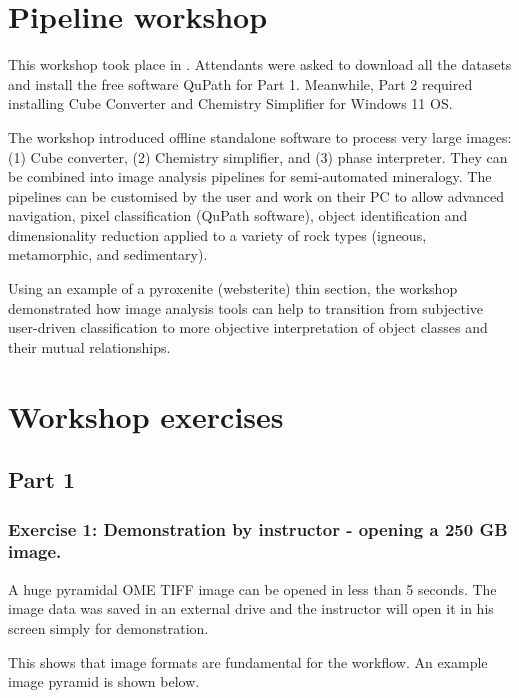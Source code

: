 \section{Pipeline workshop}
\label{chap:workshop1}
	
	This workshop took place in . Attendants were asked to download all the datasets and install the free software QuPath for Part 1. Meanwhile, Part 2 required installing Cube Converter and Chemistry Simplifier for Windows 11 OS.
	
	The workshop introduced offline standalone software to process very large images: (1) Cube converter, (2) Chemistry simplifier, and (3) phase interpreter. They can be combined into image analysis pipelines for semi-automated mineralogy. The pipelines can be customised by the user and work on their PC to allow advanced navigation, pixel classification (QuPath software), object identification and dimensionality reduction applied to a variety of rock types (igneous, metamorphic, and sedimentary). 
	
	Using an example of a pyroxenite (websterite) thin section, the workshop demonstrated how image analysis tools can help to transition from subjective user-driven classification to more objective interpretation of object classes and their mutual relationships.
	
	\section{Workshop exercises}\label{workshop-exercises}	
	
	\subsection{Part 1}\label{part-1}
	
	\subsubsection{\texorpdfstring{Exercise 1: Demonstration by instructor - opening a 250 GB image. }{Exercise 1: Demonstration by instructor - opening a 250 GB image. }}\label{exercise-1-demonstration-by-instructor---opening-a-250-gb-image.}
	
	A huge pyramidal OME TIFF image can be opened in less than 5 seconds. The image data was saved in an external drive and the instructor will open it in his screen simply for demonstration.
	
	This shows that image formats are fundamental for the workflow. An example image pyramid is shown below.
	
